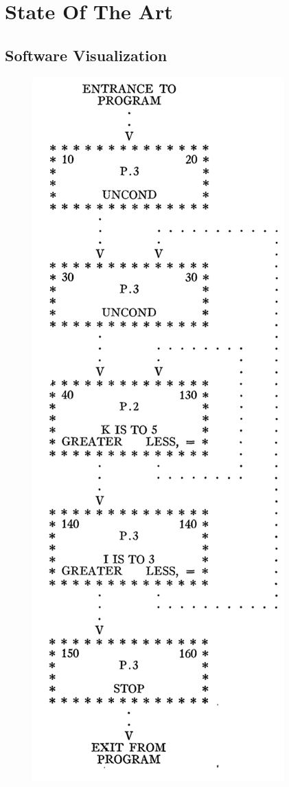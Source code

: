 
\chapter[State Of The Art]{State Of The Art}
\graphicspath{ {images/stateOfArt} }



\section{Software Visualization}


\begin{figure}
  \centering
  \includegraphics[width=0.9\linewidth]{Haibt1959_Flowchart.png} 

\end{figure}
